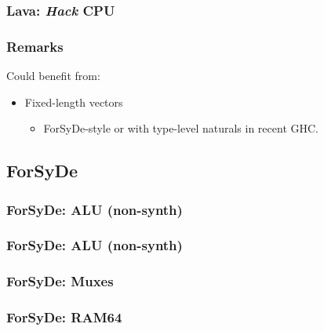 \documentclass{beamer}
\begin{document}
            \begin{frame}
                \frametitle{Lava: \emph{Hack} CPU}
            \end{frame}

            \begin{frame}
                \frametitle{Remarks}

                \par{Could benefit from:}
                \begin{itemize}
                    \item Fixed-length vectors
                        \begin{itemize}
                            \item ForSyDe-style or with type-level naturals in recent GHC.
                        \end{itemize}
                \end{itemize}
            \end{frame}


        \subsection{ForSyDe}
        \label{subsec:forsyde}

            \begin{frame}
                \frametitle{ForSyDe: ALU (non-synth)}
            \end{frame}

            \begin{frame}
                \frametitle{ForSyDe: ALU (non-synth)}
            \end{frame}



            \begin{frame}
                \frametitle{ForSyDe: Muxes}
            \end{frame}

            \begin{frame}
                \frametitle{ForSyDe: RAM64}
            \end{frame}
\end{document}
